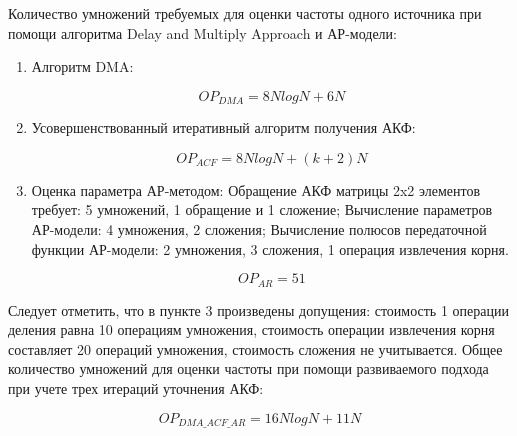 Количество умножений требуемых для оценки частоты одного источника при помощи алгоритма Delay and Multiply Approach и АР-модели:
\begin{enumerate}
\item Алгоритм DMA:
	\begin{center}
	\begin{equation}
		OP_{DMA} = 8NlogN + 6N
	\end{equation}
	\end{center}
\item Усовершенствованный итеративный алгоритм получения АКФ:
	\begin{center}
	\begin{equation}
		OP_{ACF} = 8NlogN + (k+2)N
	\end{equation}
	\end{center}
\item Оценка параметра АР-методом:
	\subitem Обращение АКФ матрицы 2x2 элементов требует: 5 умножений, 1 обращение и 1 сложение;
	\subitem Вычисление параметров АР-модели: 4 умножения, 2 сложения;
	\subitem Вычисление полюсов передаточной функции АР-модели: 2 умножения, 3 сложения, 1 операция извлечения корня.

	\begin{center}
	\begin{equation}
		OP_{AR} = 51
	\end{equation}
	\end{center}
\end{enumerate}

Следует отметить, что в пункте 3 произведены допущения: стоимость 1 операции деления равна 10 операциям умножения, стоимость операции извлечения
корня составляет 20 операций умножения, стоимость сложения не учитывается.
Общее количество умножений для оценки частоты при помощи развиваемого подхода при учете трех итераций уточнения АКФ:
\begin{center}
\begin{equation}
	OP_{DMA\_ACF\_AR} = 16NlogN + 11N
\end{equation}
\end{center}
